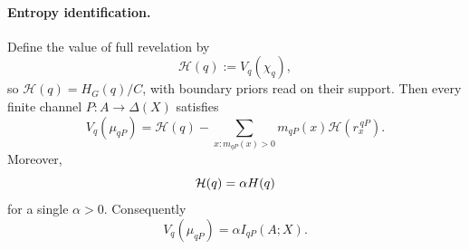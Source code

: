 \paragraph{Entropy identification.}

\begin{lemma}
\label{pt:lem:faddeevsketch}
Define the value of full revelation by
\[
 \mathcal H(q):=V_q(\chi_q),
\]
so $\mathcal H(q)=H_G(q)/C$, with boundary priors read on their support.
Then every finite channel
$P:A\to\Delta(X)$ satisfies
\begin{equation}
 V_q(\mu_{qP})
 =\mathcal H(q)-\sum_{x:m_{qP}(x)>0}
    m_{qP}(x)\mathcal H(r_x^{\,qP}).
\tag{ER}\label{pt:eq:entropy-reduction}
\end{equation}
Moreover,
\[
 \mathcal H(q)=\alpha H(q)
\]
for a single $\alpha>0$.  Consequently
\[
 V_q(\mu_{qP})=\alpha I_{qP}(A;X).
\tag{MI}\label{pt:eq:value-MI}
\]
\end{lemma}

